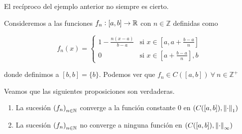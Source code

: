 \begin{eg}
    El recíproco del ejemplo anterior no siempre es cierto. 

    Consideremos a las funciones $f_n : [a,b] \to \mathbb{R}$ con $n \in \mathbb{Z}$ definidas como

    $$ f_n(x) = \begin{cases}
              1- \frac{n(x-a)}{b-a}& \text{si }  x \in [a, a + \frac{b-a}{n}]\\
              0 & \text{si } x \in [a + \frac{b-a}{n}],b
     \end{cases}$$

     donde definimos a $[b,b] = \{ b\}$. Podemos ver que $f_n \in C([a,b]) \: \forall \: n \in \mathbb{Z}^+$

     Veamos que las siguientes proposiciones son verdaderas.

     \begin{enumerate}
         \item La sucesión ${(f_n)}_{n \in \mathbb{N}}$ converge a la función constante 0 en $(C([a,b]), \norm{\cdot}_1)$
         \item La sucesión ${(f_n)}_{n \in \mathbb{N}}$ no converge a ninguna función  en $(C([a,b]), \norm{\cdot}_\infty)$
     \end{enumerate}
\end{eg}

